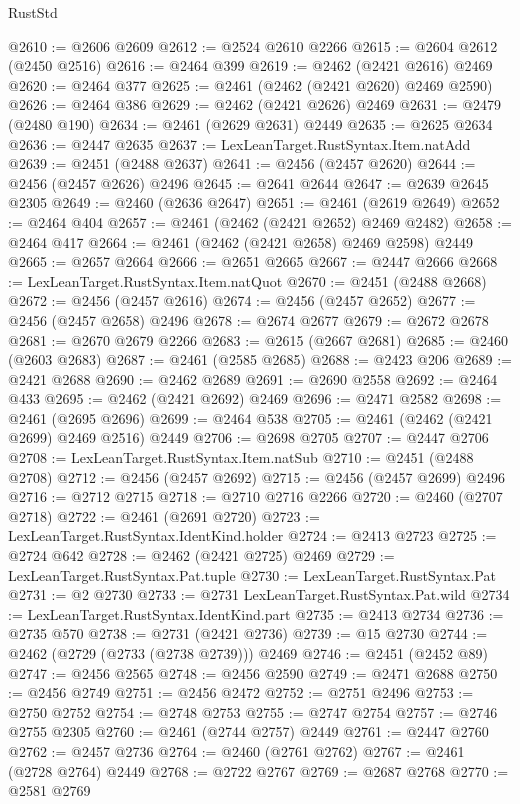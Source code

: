 \begin{lexlean}{RustStd}
\begin{coremodule}
@2610 := @2606 @2609
@2612 := @2524 @2610 @2266
@2615 := @2604 @2612 (@2450 @2516)
@2616 := @2464 @399
@2619 := @2462 (@2421 @2616) @2469
@2620 := @2464 @377
@2625 := @2461 (@2462 (@2421 @2620) @2469 @2590)
@2626 := @2464 @386
@2629 := @2462 (@2421 @2626) @2469
@2631 := @2479 (@2480 @190)
@2634 := @2461 (@2629 @2631) @2449
@2635 := @2625 @2634
@2636 := @2447 @2635
@2637 := LexLeanTarget.RustSyntax.Item.natAdd
@2639 := @2451 (@2488 @2637)
@2641 := @2456 (@2457 @2620)
@2644 := @2456 (@2457 @2626) @2496
@2645 := @2641 @2644
@2647 := @2639 @2645 @2305
@2649 := @2460 (@2636 @2647)
@2651 := @2461 (@2619 @2649)
@2652 := @2464 @404
@2657 := @2461 (@2462 (@2421 @2652) @2469 @2482)
@2658 := @2464 @417
@2664 := @2461 (@2462 (@2421 @2658) @2469 @2598) @2449
@2665 := @2657 @2664
@2666 := @2651 @2665
@2667 := @2447 @2666
@2668 := LexLeanTarget.RustSyntax.Item.natQuot
@2670 := @2451 (@2488 @2668)
@2672 := @2456 (@2457 @2616)
@2674 := @2456 (@2457 @2652)
@2677 := @2456 (@2457 @2658) @2496
@2678 := @2674 @2677
@2679 := @2672 @2678
@2681 := @2670 @2679 @2266
@2683 := @2615 (@2667 @2681)
@2685 := @2460 (@2603 @2683)
@2687 := @2461 (@2585 @2685)
@2688 := @2423 @206
@2689 := @2421 @2688
@2690 := @2462 @2689
@2691 := @2690 @2558
@2692 := @2464 @433
@2695 := @2462 (@2421 @2692) @2469
@2696 := @2471 @2582
@2698 := @2461 (@2695 @2696)
@2699 := @2464 @538
@2705 := @2461 (@2462 (@2421 @2699) @2469 @2516) @2449
@2706 := @2698 @2705
@2707 := @2447 @2706
@2708 := LexLeanTarget.RustSyntax.Item.natSub
@2710 := @2451 (@2488 @2708)
@2712 := @2456 (@2457 @2692)
@2715 := @2456 (@2457 @2699) @2496
@2716 := @2712 @2715
@2718 := @2710 @2716 @2266
@2720 := @2460 (@2707 @2718)
@2722 := @2461 (@2691 @2720)
@2723 := LexLeanTarget.RustSyntax.IdentKind.holder
@2724 := @2413 @2723
@2725 := @2724 @642
@2728 := @2462 (@2421 @2725) @2469
@2729 := LexLeanTarget.RustSyntax.Pat.tuple
@2730 := LexLeanTarget.RustSyntax.Pat
@2731 := @2 @2730
@2733 := @2731 LexLeanTarget.RustSyntax.Pat.wild
@2734 := LexLeanTarget.RustSyntax.IdentKind.part
@2735 := @2413 @2734
@2736 := @2735 @570
@2738 := @2731 (@2421 @2736)
@2739 := @15 @2730
@2744 := @2462 (@2729 (@2733 (@2738 @2739))) @2469
@2746 := @2451 (@2452 @89)
@2747 := @2456 @2565
@2748 := @2456 @2590
@2749 := @2471 @2688
@2750 := @2456 @2749
@2751 := @2456 @2472
@2752 := @2751 @2496
@2753 := @2750 @2752
@2754 := @2748 @2753
@2755 := @2747 @2754
@2757 := @2746 @2755 @2305
@2760 := @2461 (@2744 @2757) @2449
@2761 := @2447 @2760
@2762 := @2457 @2736
@2764 := @2460 (@2761 @2762)
@2767 := @2461 (@2728 @2764) @2449
@2768 := @2722 @2767
@2769 := @2687 @2768
@2770 := @2581 @2769

\end{coremodule}
\end{lexlean}
